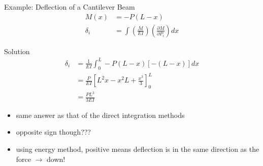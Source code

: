 \documentclass[10pt, svgnames]{beamer}
\begin{document}
\begin{frame}[label={sec:orgf3a7e35}]{Example: Deflection of a Cantilever Beam}
\begin{align*}
  M(x) &=  - P(L - x) \\
  \delta_i &= \int \left( \frac{M}{EI} \right)\left( \frac{\partial M}{\partial P_i} \right)dx
\end{align*}
\end{frame}

\begin{frame}[label={sec:org5ccafd6}]{Solution}
\begin{align*}
  \delta_{i} &= \frac{1}{EI}\int_0^L - P(L - x)[ - (L - x)]dx  \\
             &= \frac{P}{EI}\left[ L^2x - x^2L + \frac{x^3}{3} \right]_0^L \\
             &= \frac{PL^3}{3EI}
\end{align*}

\begin{itemize}
\item same answer as that of the direct integration methods

\item opposite sign though???

\item using energy method, positive means deflection is in the same
direction as the force \(\rightarrow\) down!
\end{itemize}
\end{frame}
\end{document}
